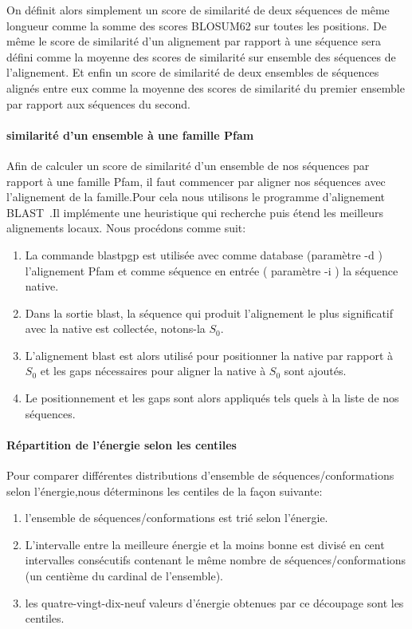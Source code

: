 On définit alors simplement un score de similarité de deux séquences de même longueur comme la somme des scores BLOSUM62 sur toutes les positions. De même le score de similarité d'un alignement par rapport à une séquence sera défini comme la moyenne des scores de similarité sur ensemble des séquences de l'alignement. Et enfin un score de similarité de deux ensembles de séquences alignés entre eux comme la moyenne des scores de similarité du premier ensemble par rapport aux séquences du second.  

\paragraph{similarité d'un ensemble à une famille Pfam}

Afin de calculer un score de similarité d'un ensemble de nos séquences par rapport à une famille Pfam, il faut commencer par aligner nos séquences avec l'alignement de la famille.Pour cela nous utilisons le programme d'alignement BLAST~\citep{refBLAST}.Il implémente une heuristique qui recherche puis étend les meilleurs alignements locaux. Nous procédons comme suit:
\begin{enumerate}
\item La commande blastpgp est utilisée avec comme database (paramètre -d ) l'alignement Pfam et comme séquence en entrée ( paramètre -i ) la séquence native. 
\item Dans la sortie blast, la séquence qui produit l'alignement le plus significatif avec la native est collectée, notons-la $S_0$. 
\item L'alignement blast est alors utilisé pour positionner la native par rapport à $S_0$ et les gaps nécessaires pour aligner la native à $S_0$ sont ajoutés.
\item  Le positionnement et les gaps sont alors appliqués tels quels à la liste de nos séquences.

\end{enumerate}


\paragraph{Répartition de l'énergie selon les centiles }

Pour comparer différentes distributions d'ensemble de séquences/conformations selon l'énergie,nous déterminons les centiles de la façon suivante: 

\begin{enumerate}
\item l'ensemble de séquences/conformations est trié selon l'énergie.
\item L'intervalle entre la meilleure énergie et la moins bonne est divisé en cent intervalles consécutifs contenant le même nombre de séquences/conformations (un centième du cardinal de l'ensemble).
\item les quatre-vingt-dix-neuf valeurs d'énergie obtenues par ce découpage sont les centiles.   
\end{enumerate}


